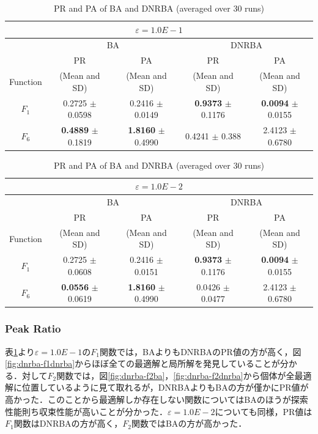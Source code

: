\documentclass[a4j,11pt]{jarticle}
\begin{document}
\begin{table}[h]
\caption{PR and PA of BA and DNRBA (averaged over 30 runs)}
\begin{center}
\begin{tabular}{c|c|c|c|c}
\multicolumn{5}{c}{$\varepsilon = 1.0E-1$} \\
\hline
\multicolumn{1}{c|}{} & \multicolumn{2}{c|}{BA} & \multicolumn{2}{c}{DNRBA} \\
\hline
 & PR & PA & PR & PA \\

Function & (Mean and SD) & (Mean and SD) & (Mean and SD) & (Mean and SD) \\
\hline
$F_1 $ & 0.2725 $\pm$ 0.0598 & 0.2416 $\pm$ 0.0149 & {\bf 0.9373} $\pm$ 0.1176  & {\bf 0.0094} $\pm$ 0.0155  \\
\hline
$F_6 $ & {\bf 0.4889} $\pm$ 0.1819 & {\bf 1.8160} $\pm$ 0.4990 & 0.4241 $\pm$ 0.388 & 2.4123 $\pm$ 0.6780 \\
\hline

\end{tabular}
\label{tab:dnrba-1}
\end{center}
\end{table}

\begin{table}[h]
\caption{PR and PA of BA and DNRBA (averaged over 30 runs)}
\begin{center}
\begin{tabular}{c|c|c|c|c}
\multicolumn{5}{c}{$\varepsilon = 1.0E-2$} \\
\hline
\multicolumn{1}{c|}{} & \multicolumn{2}{c|}{BA} & \multicolumn{2}{c}{DNRBA} \\
\hline
 & PR & PA & PR & PA \\

Function & (Mean and SD) & (Mean and SD) & (Mean and SD) & (Mean and SD) \\
\hline
$F_1 $ & 0.2725 $\pm$ 0.0608 & 0.2416 $\pm$ 0.0151 & {\bf 0.9373} $\pm$ 0.1176  & {\bf 0.0094} $\pm$ 0.0155  \\
\hline
$F_6 $ & {\bf 0.0556} $\pm$ 0.0619 & {\bf 1.8160} $\pm$ 0.4990 & 0.0426 $\pm$ 0.0477 & 2.4123 $\pm$ 0.6780 \\
\hline

\end{tabular}
\label{tab:dnrba-2}
\end{center}
\end{table}

\subsubsection{Peak Ratio}
表\ref{tab:dnrba-1}より$\varepsilon=1.0E-1$の$F_1$関数では，BAよりもDNRBAのPR値の方が高く，図\ref{fig:dnrba-f1dnrba}からほぼ全ての最適解と局所解を発見していることが分かる．対して$F_2$関数では，図\ref{fig:dnrba-f2ba}，\ref{fig:dnrba-f2dnrba}から個体が全最適解に位置しているように見て取れるが，DNRBAよりもBAの方が僅かにPR値が高かった．このことから最適解しか存在しない関数についてはBAのほうが探索性能則ち収束性能が高いことが分かった．$\varepsilon=1.0E-2$についても同様，PR値は$F_1$関数はDNRBAの方が高く，$F_2$関数ではBAの方が高かった．
\end{document}
